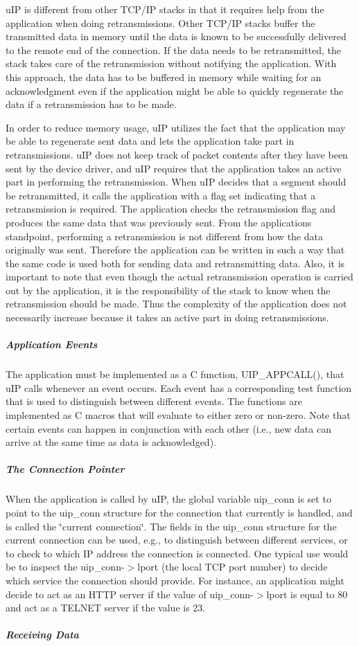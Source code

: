 u\+IP is different from other T\+C\+P/\+IP stacks in that it requires help from the application when doing retransmissions. Other T\+C\+P/\+IP stacks buffer the transmitted data in memory until the data is known to be successfully delivered to the remote end of the connection. If the data needs to be retransmitted, the stack takes care of the retransmission without notifying the application. With this approach, the data has to be buffered in memory while waiting for an acknowledgment even if the application might be able to quickly regenerate the data if a retransmission has to be made.

In order to reduce memory usage, u\+IP utilizes the fact that the application may be able to regenerate sent data and lets the application take part in retransmissions. u\+IP does not keep track of packet contents after they have been sent by the device driver, and u\+IP requires that the application takes an active part in performing the retransmission. When u\+IP decides that a segment should be retransmitted, it calls the application with a flag set indicating that a retransmission is required. The application checks the retransmission flag and produces the same data that was previously sent. From the application\textquotesingle{}s standpoint, performing a retransmission is not different from how the data originally was sent. Therefore the application can be written in such a way that the same code is used both for sending data and retransmitting data. Also, it is important to note that even though the actual retransmission operation is carried out by the application, it is the responsibility of the stack to know when the retransmission should be made. Thus the complexity of the application does not necessarily increase because it takes an active part in doing retransmissions.\hypertarget{a00074_appevents}{}\subparagraph{Application Events}\label{a00074_appevents}
The application must be implemented as a C function, U\+I\+P\+\_\+\+A\+P\+P\+C\+A\+L\+L(), that u\+IP calls whenever an event occurs. Each event has a corresponding test function that is used to distinguish between different events. The functions are implemented as C macros that will evaluate to either zero or non-\/zero. Note that certain events can happen in conjunction with each other (i.\+e., new data can arrive at the same time as data is acknowledged).\hypertarget{a00074_connstate}{}\subparagraph{The Connection Pointer}\label{a00074_connstate}
When the application is called by u\+IP, the global variable uip\+\_\+conn is set to point to the uip\+\_\+conn structure for the connection that currently is handled, and is called the \char`\"{}current connection\char`\"{}. The fields in the uip\+\_\+conn structure for the current connection can be used, e.\+g., to distinguish between different services, or to check to which IP address the connection is connected. One typical use would be to inspect the uip\+\_\+conn-\/$>$lport (the local T\+CP port number) to decide which service the connection should provide. For instance, an application might decide to act as an H\+T\+TP server if the value of uip\+\_\+conn-\/$>$lport is equal to 80 and act as a T\+E\+L\+N\+ET server if the value is 23.\hypertarget{a00074_recvdata}{}\subparagraph{Receiving Data}\label{a00074_recvdata}
